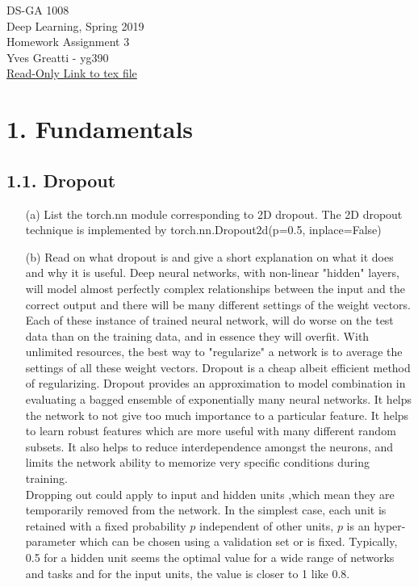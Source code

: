 \documentclass[11pt]{article}
\newcommand{\0}{\mat{0}}
\begin{document}
\noindent DS-GA 1008\\
Deep Learning, Spring 2019\\
Homework Assignment 3 \\
Yves Greatti - yg390\\
\href{https://www.overleaf.com/project/5c8521e162afe55c8eda31eb}{Read-Only Link to tex file}


\section*{1. Fundamentals}

\subsection*{1.1. Dropout}

\begin{itemize}
    \item[(a)]    List the torch.nn module corresponding to 2D dropout. The 2D dropout  technique is implemented by torch.nn.Dropout2d(p=0.5, inplace=False)
    \item[(b)]  Read on what dropout is and give a short explanation on what it does and why
it is useful.
Deep neural networks, with non-linear "hidden" layers, will model almost perfectly complex relationships between the input and the correct output and there will be many different settings of the weight vectors. Each of these instance of trained neural network, will do worse on the test data than on the training data, and in essence they will overfit. With unlimited resources, the best way to "regularize" a network is to average the settings of all these weight vectors. Dropout is a cheap albeit efficient method of regularizing. Dropout provides an approximation to model combination  in evaluating a bagged ensemble of exponentially many neural networks.  It helps the network to not give too much importance to a particular feature. It helps to learn robust features which are more useful with many different random subsets. It also helps to reduce interdependence amongst the neurons, and limits the network ability to memorize very specific conditions during training.\\
Dropping out could apply to input and hidden units ,which mean they are temporarily removed from the network. In the simplest case, each unit is retained with a fixed probability $p$ independent of other units, $p$ is an hyper-parameter which can be chosen using a validation set or is fixed. Typically, 0.5 for a hidden unit seems the optimal value for a wide range of networks and tasks and for the input units, the  value is closer to 1 like 0.8.\\

\end{itemize}
\end{document}
